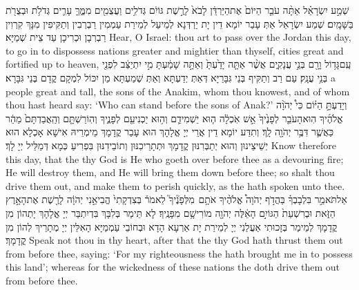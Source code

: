 \newperek
{}
{שְׁמַ֣ע יִשְׂרָאֵ֗ל אַתָּ֨ה עֹבֵ֤ר הַיּוֹם֙ אֶת\maqqaf הַיַּרְדֵּ֔ן לָבֹא֙ לָרֶ֣שֶׁת גּוֹיִ֔ם גְּדֹלִ֥ים וַעֲצֻמִ֖ים מִמֶּ֑ךָּ עָרִ֛ים גְּדֹלֹ֥ת וּבְצֻרֹ֖ת בַּשָּׁמָֽיִם׃}
{שְׁמַע יִשְׂרָאֵל אַתְּ עָבַר יוֹמָא דֵין יָת יַרְדְּנָא לְמֵיעַל לְמֵירַת עַמְמִין רַבְרְבִין וְתַקִּיפִין מִנָּךְ קִרְוִין רַבְרְבָן וּכְרִיכָן עַד צֵית שְׁמַיָּא׃}
{Hear, O Israel: thou art to pass over the Jordan this day, to go in to dispossess nations greater and mightier than thyself, cities great and fortified up to heaven,}{}
{עַֽם\maqqaf גָּד֥וֹל וָרָ֖ם בְּנֵ֣י עֲנָקִ֑ים אֲשֶׁ֨ר אַתָּ֤ה יָדַ֙עְתָּ֙ וְאַתָּ֣ה שָׁמַ֔עְתָּ מִ֣י יִתְיַצֵּ֔ב לִפְנֵ֖י בְּנֵ֥י עֲנָֽק׃}
{עַם רַב וְתַקִּיף בְּנֵי גִּבָּרַיָּא דְּאַתְּ יְדַעְתָּא וְאַתְּ שְׁמַעְתָּא מַן יִכּוֹל לִמְקָם קֳדָם בְּנֵי גִּבָּרָא׃}
{a people great and tall, the sons of the Anakim, whom thou knowest, and of whom thou hast heard say: ‘Who can stand before the sons of Anak?’}{}
{וְיָדַעְתָּ֣ הַיּ֗וֹם כִּי֩ יְהֹוָ֨ה אֱלֹהֶ֜יךָ הֽוּא\maqqaf הָעֹבֵ֤ר לְפָנֶ֙יךָ֙ אֵ֣שׁ אֹֽכְלָ֔ה ה֧וּא יַשְׁמִידֵ֛ם וְה֥וּא יַכְנִיעֵ֖ם לְפָנֶ֑יךָ וְהֽוֹרַשְׁתָּ֤ם וְהַֽאֲבַדְתָּם֙ מַהֵ֔ר כַּאֲשֶׁ֛ר דִּבֶּ֥ר יְהֹוָ֖ה לָֽךְ׃}
{וְתִדַּע יוֹמָא דֵין אֲרֵי יְיָ אֱלָהָךְ הוּא עָבַר קֳדָמָךְ מֵימְרֵיהּ אִישָׁא אָכְלָא הוּא יְשֵׁיצֵינוּן וְהוּא יְתַבְּרִנּוּן קֳדָמָךְ וּתְתָרֵיכִנּוּן וְתוֹבֵידִנּוּן בִּפְרִיעַ כְּמָא דְּמַלֵּיל יְיָ לָךְ׃}
{Know therefore this day, that the \lord\space thy God is He who goeth over before thee as a devouring fire; He will destroy them, and He will bring them down before thee; so shalt thou drive them out, and make them to perish quickly, as the \lord\space hath spoken unto thee.}{}
{אַל\maqqaf תֹּאמַ֣ר בִּלְבָבְךָ֗ בַּהֲדֹ֣ף יְהֹוָה֩ אֱלֹהֶ֨יךָ אֹתָ֥ם \pasek  מִלְּפָנֶ֘יךָ֮ לֵאמֹר֒ בְּצִדְקָתִי֙ הֱבִיאַ֣נִי יְהֹוָ֔ה לָרֶ֖שֶׁת אֶת\maqqaf הָאָ֣רֶץ הַזֹּ֑את וּבְרִשְׁעַת֙ הַגּוֹיִ֣ם הָאֵ֔לֶּה יְהֹוָ֖ה מוֹרִישָׁ֥ם מִפָּנֶֽיךָ׃}
{לָא תֵּימַר בְּלִבָּךְ בִּדְיִתְבַּר יְיָ אֱלָהָךְ יָתְהוֹן מִן קֳדָמָךְ לְמֵימַר בְּזָכוּתִי אַעֲלַנִי יְיָ לְמֵירַת יָת אַרְעָא הָדָא וּבְחוֹבֵי עַמְמַיָּא הָאִלֵּין יְיָ מְתָרֵיךְ לְהוֹן מִן קֳדָמָךְ׃}
{Speak not thou in thy heart, after that the \lord\space thy God hath thrust them out from before thee, saying: ‘For my righteousness the \lord\space hath brought me in to possess this land’; whereas for the wickedness of these nations the \lord\space doth drive them out from before thee.}{}
